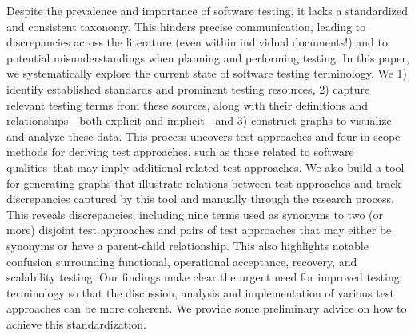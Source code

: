 \label{abstract}%
Despite the prevalence and importance of software testing, it lacks
a standardized and consistent taxonomy. This hinders precise communication,
leading to discrepancies across the literature (even within individual
documents!) and to potential misunderstandings when planning and performing
testing. In this paper, we systematically explore the current state of
software testing terminology. We 1) identify established standards
and prominent testing resources, 2) capture relevant testing terms
from these sources, along with their definitions and relationships---both
explicit and implicit---and 3) construct graphs to visualize and analyze
these data. This process uncovers \approachCount{} test approaches and
\ifnotpaper four in-scope methods for deriving test approaches, such as those
    related to \fi \qualityCount{} software qualities\ifnotpaper\else\ that may
    imply additional related test approaches\fi. We also build
a tool for generating graphs that illustrate relations between test
approaches and track discrepancies captured by this tool and manually through
the research process. This reveals \discrepCount{} discrepancies,
including nine terms used as synonyms to two (or more) disjoint test approaches
and \parSynCount{} pairs of test approaches that may either be synonyms or have
a parent-child relationship. This also highlights notable confusion surrounding
functional, operational acceptance, recovery, and scalability testing. Our
findings make clear the urgent need for improved testing terminology so that
the discussion, analysis and implementation of various test approaches can be
more coherent. We provide some preliminary advice on how to achieve this
standardization.